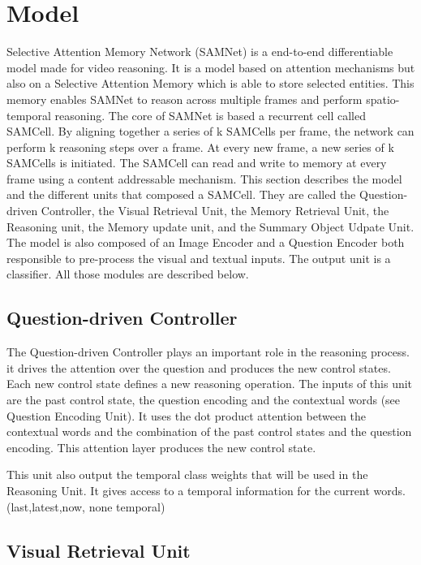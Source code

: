 \section{Model}

Selective Attention Memory Network (SAMNet) is a end-to-end differentiable model made for video reasoning. It is a model based on attention mechanisms but also on a Selective Attention Memory which is able to store selected entities. This memory enables SAMNet to reason across multiple frames and perform spatio-temporal reasoning. 
The core of SAMNet is based a recurrent cell called SAMCell. By aligning together a series of k SAMCells per frame, the network can perform k reasoning steps over a frame. At every new frame, a new series of k SAMCells is initiated. The SAMCell can read and write to memory at every frame using a content addressable mechanism. This section describes the model and the different units that composed a SAMCell. They are called the Question-driven Controller, the Visual Retrieval Unit, the Memory Retrieval Unit, the Reasoning unit, the Memory update unit, and the Summary Object Udpate Unit. 
The model is also composed of an Image Encoder and a Question Encoder both responsible to pre-process the visual and textual inputs. The output unit is a classifier.
All those modules are described below.

\subsection{Question-driven Controller}

The Question-driven Controller plays an important role in the reasoning process.
it drives the attention over the question and produces the new control states. Each new control state defines a new reasoning operation. The inputs of this unit are the past control state, the question encoding and the contextual words (see Question Encoding Unit). It uses the dot product attention between the contextual words
and the combination of the past control states and the question encoding.  This attention layer produces the new control state.

This unit also output the temporal class weights that will be used in the Reasoning Unit. It gives access to a temporal information for the current words. (last,latest,now, none temporal)

\subsection{Visual Retrieval Unit}

